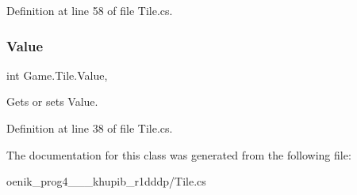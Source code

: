 Definition at line 58 of file Tile.\+cs.

\mbox{\label{class_game_1_1_tile_a946c80097e8794e44ecf54ca52584280}} 
\subsubsection{\texorpdfstring{Value}{Value}}
{\footnotesize\ttfamily int Game.\+Tile.\+Value\hspace{0.3cm}{\ttfamily [get]}, {\ttfamily [set]}}



Gets or sets Value. 



Definition at line 38 of file Tile.\+cs.



The documentation for this class was generated from the following file\+:\begin{DoxyCompactItemize}
\item 
oenik\+\_\+prog4\+\_\+\_\+\_\+khupib\+\_\+r1dddp/Tile.\+cs\end{DoxyCompactItemize}
